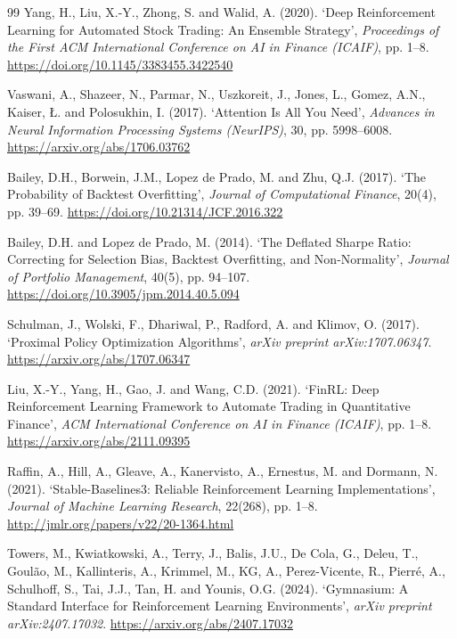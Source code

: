 \documentclass[11pt,a4paper]{article}
\begin{document}
\newpage
\begin{thebibliography}{99}
\small
\setlength{\itemsep}{1.5pt plus 0.5pt minus 0.5pt}
\setlength{\parskip}{0pt}
 Yang, H., Liu, X.-Y., Zhong, S. and Walid, A. (2020). `Deep Reinforcement Learning for Automated Stock Trading: An Ensemble Strategy', \textit{Proceedings of the First ACM International Conference on AI in Finance (ICAIF)}, pp. 1--8. \url{https://doi.org/10.1145/3383455.3422540}

 Vaswani, A., Shazeer, N., Parmar, N., Uszkoreit, J., Jones, L., Gomez, A.N., Kaiser, \L. and Polosukhin, I. (2017). `Attention Is All You Need', \textit{Advances in Neural Information Processing Systems (NeurIPS)}, 30, pp. 5998--6008. \url{https://arxiv.org/abs/1706.03762}

 Bailey, D.H., Borwein, J.M., Lopez de Prado, M. and Zhu, Q.J. (2017). `The Probability of Backtest Overfitting', \textit{Journal of Computational Finance}, 20(4), pp. 39--69. \url{https://doi.org/10.21314/JCF.2016.322}

 Bailey, D.H. and Lopez de Prado, M. (2014). `The Deflated Sharpe Ratio: Correcting for Selection Bias, Backtest Overfitting, and Non-Normality', \textit{Journal of Portfolio Management}, 40(5), pp. 94--107. \url{https://doi.org/10.3905/jpm.2014.40.5.094}

 Schulman, J., Wolski, F., Dhariwal, P., Radford, A. and Klimov, O. (2017). `Proximal Policy Optimization Algorithms', \textit{arXiv preprint arXiv:1707.06347}. \url{https://arxiv.org/abs/1707.06347}

 Liu, X.-Y., Yang, H., Gao, J. and Wang, C.D. (2021). `FinRL: Deep Reinforcement Learning Framework to Automate Trading in Quantitative Finance', \textit{ACM International Conference on AI in Finance (ICAIF)}, pp. 1--8. \url{https://arxiv.org/abs/2111.09395}

 Raffin, A., Hill, A., Gleave, A., Kanervisto, A., Ernestus, M. and Dormann, N. (2021). `Stable-Baselines3: Reliable Reinforcement Learning Implementations', \textit{Journal of Machine Learning Research}, 22(268), pp. 1--8. \url{http://jmlr.org/papers/v22/20-1364.html}

 Towers, M., Kwiatkowski, A., Terry, J., Balis, J.U., De Cola, G., Deleu, T., Goul\~ao, M., Kallinteris, A., Krimmel, M., KG, A., Perez-Vicente, R., Pierr\'e, A., Schulhoff, S., Tai, J.J., Tan, H. and Younis, O.G. (2024). `Gymnasium: A Standard Interface for Reinforcement Learning Environments', \textit{arXiv preprint arXiv:2407.17032}. \url{https://arxiv.org/abs/2407.17032}


\end{thebibliography}
\end{document}

